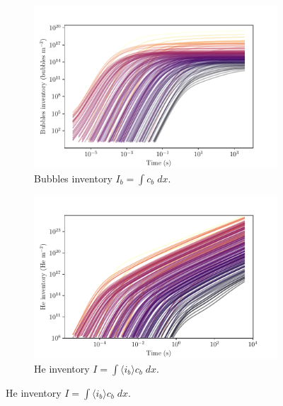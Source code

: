 \begin{figure} [ht!]
    \centering
    \begin{subfigure}{0.5\linewidth}
        \centering
        \includegraphics[width=\linewidth]{Figures/Chapter4/parametric study/total_bubbles_time.pdf}
        \caption{Bubbles inventory $I_b = \int c_b \; dx$.}
    \end{subfigure}%
    \begin{subfigure}{0.5\linewidth}
        \centering
        \includegraphics[width=\linewidth]{Figures/Chapter4/parametric study/inventory_time.pdf}
        \caption{He inventory $I = \int \langle i_b \rangle c_b \; dx$.}
    \end{subfigure}

\end{figure}
